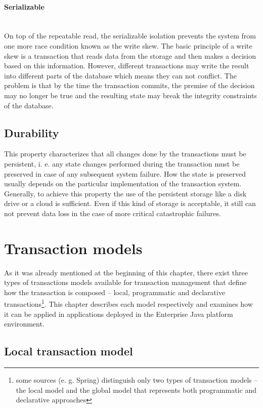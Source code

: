 \documentclass[oneside,
  digital, %
  table,   %
  nolof,     %
  nolot,     %
]{fithesis3}
\newcommand{\newlinepar}[1]{\paragraph{#1}\needspace{4\baselineskip}\mbox{}\\}
\begin{document}
\newlinepar{Serializable}

On top of the repeatable read, the serializable isolation prevents the system from one more race condition known as the write skew. The basic principle of a write skew is a transaction that reads data from the storage and then makes a decision based on this information. However, different transactions may write the result into different parts of the database which means they can not conflict. The problem is that by the time the transaction commits, the premise of the decision may no longer be true and the resulting state may break the integrity constraints of the database.

\subsection{Durability}

This property characterizes that all changes done by the transactions must be persistent, i. e. any state changes performed during the transaction must be preserved in case of any subsequent system failure. How the state is preserved usually depends on the particular implementation of the transaction system. Generally, to achieve this property the use of the persistent storage like a disk drive or a cloud is sufficient. Even if this kind of storage is acceptable, it still can not prevent data loss in the case of more critical catastrophic failures.



\section{Transaction models}

As it was already mentioned at the beginning of this chapter, there exist three types of transactions models available for transaction management that define how the transaction is composed -- local, programmatic and declarative transactions\footnote{some sources (e. g. Spring) distinguish only two types of transaction models -- the local model and  the global model that represents both programmatic and declarative approaches}. This chapter describes each model respectively and examines how it can be applied in applications deployed in the Enterprise Java platform environment.

\subsection{Local transaction model}
\end{document}
